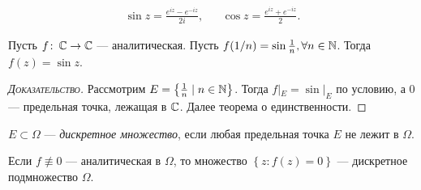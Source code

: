 \documentclass[../complex-analysis.tex]{subfiles}
\begin{document}
\begin{df}
 \begin{align*}
  \sin z = \frac{e^{iz} - e^{-iz}}{2i}, & & \cos z = \frac{e^{iz} + e^{-iz}}{2}.
 \end{align*} 
\end{df}
\begin{exmpl}
 Пусть $ f\colon\,\mathbb{C}\to\mathbb{C} $ --- аналитическая. Пусть $ f(1 / n) = \sin \frac{1}{n} , \forall n \in \mathbb{N}$. Тогда $ f(z) = \sin z $.
\end{exmpl}
\begin{proof}[\normalfont\textsc{Доказательство}]
 Рассмотрим $ E = \left\{ \frac{1}{n} \mid n \in \mathbb{N} \right\} $. Тогда $ f|_E = \sin|_E $ по условию, а $ 0 $ --- предельная точка, лежащая в $ \mathbb{C} $. Далее теорема о единственности.
\end{proof}

\begin{df}
 $ E \subset \Omega $ --- \textit{дискретное множество}, если любая предельная точка $ E $ не лежит в $ \Omega $.
\end{df}
\begin{crly}
 Если $ f \not\equiv 0 $ --- аналитическая в $ \Omega $, то множество $ \left\{ z \colon f(z) = 0 \right\} $ --- дискретное подмножество $ \Omega $.
\end{crly}
\end{document}
